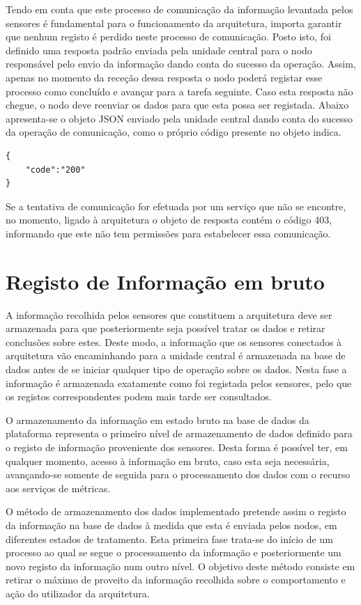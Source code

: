 Tendo em conta que este processo de comunicação da informação levantada pelos sensores é fundamental para o funcionamento da arquitetura, importa garantir que nenhum registo é perdido neste processo de comunicação. Posto isto, foi definido uma resposta padrão enviada pela unidade central para o nodo responsável pelo envio da informação dando conta do sucesso da operação. Assim, apenas no momento da receção dessa resposta o nodo poderá registar esse processo como concluído e avançar para a tarefa seguinte. Caso esta resposta não chegue, o nodo deve reenviar os dados para que esta possa ser registada. Abaixo apresenta-se o objeto JSON enviado pela unidade central dando conta do sucesso da operação de comunicação, como o próprio código presente no objeto indica.\\

\begin{lstlisting}[caption=Mensagem de sucesso em JSON]
{
	"code":"200"
}
\end{lstlisting}


Se a tentativa de comunicação for efetuada por um serviço que não se encontre, no momento, ligado à arquitetura o objeto de resposta contém o código 403, informando que este não tem permissões para estabelecer essa comunicação.


\section{Registo de Informação em bruto}

A informação recolhida pelos sensores que constituem a arquitetura deve ser armazenada para que posteriormente seja possível tratar os dados e retirar conclusões sobre estes. Deste modo, a informação que os sensores conectados à arquitetura vão encaminhando para a unidade central é armazenada na base de dados antes de se iniciar qualquer tipo de operação sobre os dados. Nesta fase a informação é armazenada exatamente como foi registada pelos sensores, pelo que os registos correspondentes podem mais tarde ser consultados.

O armazenamento da informação em estado bruto na base de dados da plataforma representa o primeiro nível de armazenamento de dados definido para o registo de informação proveniente dos sensores. Desta forma é possível ter, em qualquer momento, acesso à informação em bruto, caso esta seja necessária, avançando-se somente de seguida para o processamento dos dados com o recurso aos serviços de métricas. 

O método de armazenamento dos dados implementado pretende assim o registo da informação na base de dados à medida que esta é enviada pelos nodos, em diferentes estados de tratamento. Esta primeira fase trata-se do início de um processo ao qual se segue o processamento da informação e posteriormente um novo registo da informação num outro nível. O objetivo deste método consiste em retirar o máximo de proveito da informação recolhida sobre o comportamento e ação do utilizador da arquitetura. 

